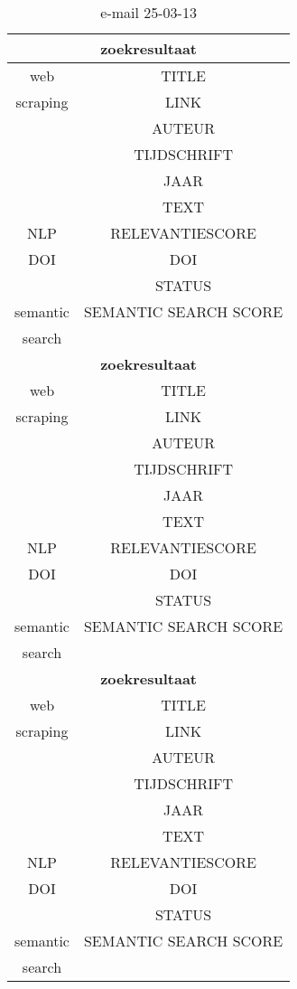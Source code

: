 \begin{table}[h!]
    \caption{e-mail 25-03-13}
    \centering
    \begin{tabular}{|c|c|} 
        \hline
        \multicolumn{2}{|c|}{\textbf{zoekresultaat}} \\
        \hline
        web &TITLE\\
        scraping&LINK\\
        &AUTEUR\\
        &TIJDSCHRIFT\\
        &JAAR\\
        &TEXT\\
        \hline
        NLP&RELEVANTIESCORE\\
        \hline
        DOI&DOI\\
        &STATUS\\
        \hline
        semantic&SEMANTIC SEARCH SCORE\\
        search&\\
        \hline
        \multicolumn{2}{|c|}{\textbf{zoekresultaat}} \\
        \hline
        web &TITLE\\
        scraping&LINK\\
        &AUTEUR\\
        &TIJDSCHRIFT\\
        &JAAR\\
        &TEXT\\
        \hline
        NLP&RELEVANTIESCORE\\
        \hline
        DOI&DOI\\
        &STATUS\\
        \hline
        semantic&SEMANTIC SEARCH SCORE\\
        search&\\
        \hline
        \multicolumn{2}{|c|}{\textbf{zoekresultaat}} \\
        \hline
        web &TITLE\\
        scraping&LINK\\
        &AUTEUR\\
        &TIJDSCHRIFT\\
        &JAAR\\
        &TEXT\\
        \hline
        NLP&RELEVANTIESCORE\\
        \hline
        DOI&DOI\\
        &STATUS\\
        \hline
        semantic&SEMANTIC SEARCH SCORE\\
        search&\\
        \hline
    \end{tabular}
    \label{table:email20250313}
\end{table}
